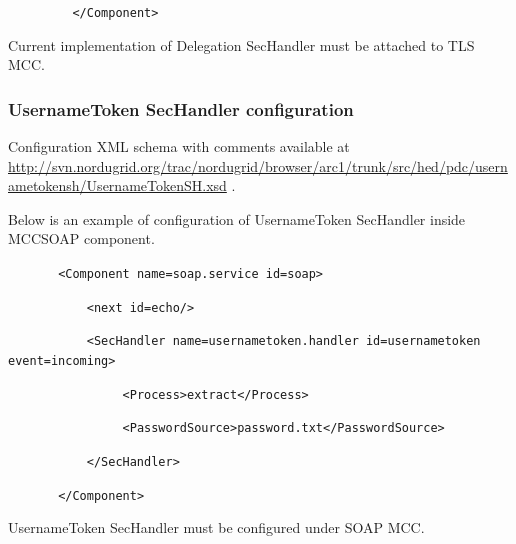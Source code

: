 \documentclass{article}
\begin{document}
{\upshape\color{black}
\texttt{\ \ \ \ \ \ \ \ \ {\textless}/Component{\textgreater}}}

{\upshape\color{black}
Current implementation of Delegation\textbf{ }SecHandler must be
attached to TLS MCC. }

\subsubsection[UsernameToken SecHandler configuration]{UsernameToken
SecHandler configuration}
{\upshape\color{black}
Configuration XML schema with comments available at
\url{http://svn.nordugrid.org/trac/nordugrid/browser/arc1/trunk/src/hed/pdc/usernametokensh/UsernameTokenSH.xsd}
.}

{\upshape\color{black}
Below is an example of configuration of UsernameToken SecHandler inside
MCCSOAP component.}

{\upshape\color{black}
\texttt{\ \ \ \ \ \ \ {\textless}Component
name={\textquotedbl}soap.service{\textquotedbl}
id={\textquotedbl}soap{\textquotedbl}{\textgreater}}}

{\upshape\color{black}
\texttt{\ \ \ \ \ \ \ \ \ \ \ {\textless}next
id={\textquotedbl}echo{\textquotedbl}/{\textgreater}}}

{\upshape\color{black}
\texttt{\ \ \ \ \ \ \ \ \ \ \ {\textless}SecHandler
name={\textquotedbl}usernametoken.handler{\textquotedbl}
id={\textquotedbl}usernametoken{\textquotedbl}
event={\textquotedbl}incoming{\textquotedbl}{\textgreater}}}

{\upshape\color{black}
\texttt{\ \ \ \ \ \ \ \ \ \ \ \ \ \ \ \ {\textless}Process{\textgreater}extract{\textless}/Process{\textgreater}}}

{\upshape\color{black}
\texttt{\ \ \ \ \ \ \ \ \ \ \ \ \ \ \ \ {\textless}PasswordSource{\textgreater}password.txt{\textless}/PasswordSource{\textgreater}}}

{\upshape\color{black}
\texttt{\ \ \ \ \ \ \ \ \ \ \ {\textless}/SecHandler{\textgreater}}}

{\upshape\color{black}
\texttt{\ \ \ \ \ \ \ {\textless}/Component{\textgreater}}}

{\color{black}
UsernameToken SecHandler must be configured under SOAP MCC.}
\end{document}
